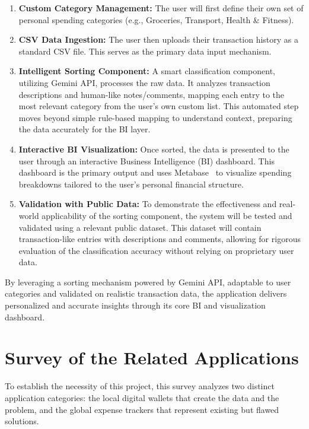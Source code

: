 \begin{enumerate}
	\item \textbf{Custom Category Management:} The user will first define their own set of personal spending categories (e.g., Groceries, Transport, Health \& Fitness).
	\item \textbf{CSV Data Ingestion:} The user then uploads their transaction history as a standard CSV file. This serves as the primary data input mechanism.
	\item \textbf{Intelligent Sorting Component:} A smart classification component, utilizing Gemini API, processes the raw data. It analyzes transaction descriptions and human-like notes/comments, mapping each entry to the most relevant category from the user's own custom list. This automated step moves beyond simple rule-based mapping to understand context, preparing the data accurately for the BI layer.
	\item \textbf{Interactive BI Visualization:} Once sorted, the data is presented to the user through an interactive Business Intelligence (BI) dashboard. This dashboard is the primary output and uses Metabase~\cite{metabase2024bi} to visualize spending breakdowns tailored to the user's personal financial structure.
	\item \textbf{Validation with Public Data:} To demonstrate the effectiveness and real-world applicability of the sorting component, the system will be tested and validated using a relevant public dataset. This dataset will contain transaction-like entries with descriptions and comments, allowing for rigorous evaluation of the classification accuracy without relying on proprietary user data.
\end{enumerate}
By leveraging a sorting mechanism powered by Gemini API, adaptable to user categories and validated on realistic transaction data, the application delivers personalized and accurate insights through its core BI and visualization dashboard.

\section{Survey of the Related Applications}
To establish the necessity of this project, this survey analyzes two distinct application categories: the local digital wallets that create the data and the problem, and the global expense trackers that represent existing but flawed solutions.

